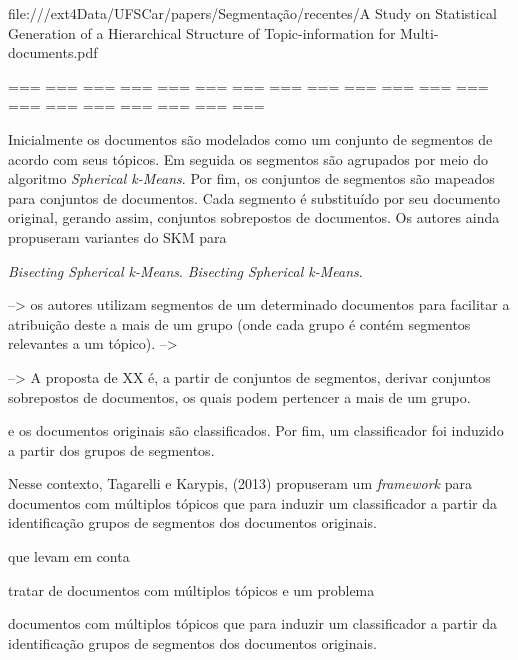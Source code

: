 file:///ext4Data/UFSCar/papers/Segmentação/recentes/A Study on Statistical Generation of a Hierarchical Structure of Topic-information for Multi-documents.pdf
~\cite{NGUYEN Viet Cuong}

=== === === === === === === === === === === === === === === === === === === === 



Inicialmente os documentos são modelados como um conjunto de segmentos de acordo com seus tópicos. Em seguida os segmentos são agrupados por meio do algoritmo \textit{Spherical k-Means}\cite{I. S. Dhillon and D. S. Modha,   Y. Zhao and G. Karypis}. Por fim, os conjuntos de segmentos são mapeados para conjuntos de documentos. Cada segmento é substituído por seu documento original, gerando assim, conjuntos sobrepostos de documentos. Os autores ainda propuseram variantes do SKM para 


\textit{Bisecting Spherical k-Means}\cite{Y. Zhao and G. Karypis}.
\textit{Bisecting Spherical k-Means}\cite{I. S. Dhillon and D. S. Modha,   Y. Zhao and G. Karypis}.

--> os autores utilizam segmentos de um determinado documentos para facilitar a atribuição deste a mais de um grupo (onde cada grupo é contém segmentos relevantes a um tópico).
--> 

--> A proposta de XX é, a partir de conjuntos de segmentos, derivar conjuntos sobrepostos de documentos, os quais podem pertencer a mais de um grupo.




e os documentos originais são classificados. Por fim, um classificador foi induzido a partir dos grupos de segmentos.



Nesse contexto, Tagarelli e Karypis, (2013) propuseram um \textit{framework} para documentos com múltiplos tópicos que para induzir um classificador a partir da identificação grupos de segmentos dos documentos originais.


que levam em conta 




tratar de documentos com múltiplos tópicos e um problema 

documentos com múltiplos tópicos que para induzir um classificador a partir da identificação grupos de segmentos dos documentos originais.



